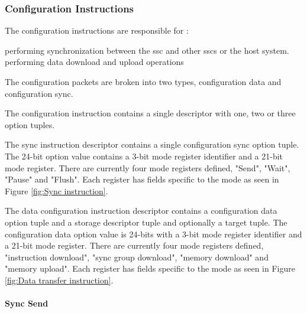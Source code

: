 \subsubsection{Configuration Instructions}
\label{sec:Decoding Configuration Instructions}

The configuration instructions are responsible for :
\begin{outline}
 \1 performing synchronization between the \ac{ssc} and other \acp{ssc} or the host system.
 \1 performing data download and upload operations
\end{outline}

The configuration packets are broken into two types, configuration data and configuration sync.
\iffalse
Currently the sync instruction has been implemented.
It is assumed at this point that adequate infrastructure and extensibility has been built into the system to allow implementation without adding significant amouts of logic.
\fi

The configuration instruction contains a single descriptor with one, two or three option tuples.

The sync instruction descriptor contains a single configuration sync option tuple. The 24-bit option value contains a 3-bit mode register identifier and a 21-bit mode register.
There are currently four mode registers defined, "Send", "Wait", "Pause" and "Flush". Each register has fields specific to the mode as seen in Figure \ref{fig:Sync instruction}.

The data configuration instruction descriptor contains a configuration data option tuple and a storage descriptor tuple and optionally a target tuple. 
The configuration data option value is 24-bits with a 3-bit mode register identifier and a 21-bit mode register.
There are currently four mode registers defined, "instruction download", "sync group download", "memory download" and "memory upload". Each register has fields specific to the mode as seen in Figure \ref{fig:Data transfer instruction}.

\paragraph{Sync Send}

